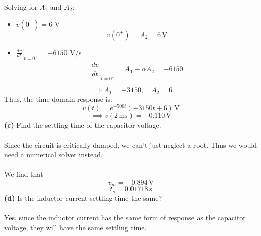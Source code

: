 \documentclass[12pt]{article}
\begin{document}
Solving for $A_1$ and $A_2$:
\begin{itemize}
    \item $v(0^+) = 6$ V
    \[v(0^+) = A_2 = 6\,\text{V}\]
    \item $\left.\frac{dv}{dt}\right|_{t=0^+} = -6150$ V/s
    \[ \left.\frac{dv}{dt}\right|_{t=0^+} = A_1 - \alpha A_2 = -6150 \]
\end{itemize}
\[\implies A_1 = -3150,\quad A_2 = 6\]
Thus, the time domain response is:
\[\boxed{v(t) = e^{-500t}(-3150t + 6)\,\text{V}}\]
\[\implies \boxed{v(2\,\text{ms}) = -0.110\,\text{V}}\]
\textbf{(c)} Find the settling time of the capacitor voltage.\\\\
Since the circuit is critically damped, we can't just neglect a root. Thus we would need a numerical solver instead.\\\\
We find that
\[v_m=-0.894\,\text{V}\]
\[\boxed{t_s = 0.01718\,\text{s}}\]
\textbf{(d)} Is the inductor current settling time the same?\\\\
Yes, since the inductor current has the same form of response as the capacitor voltage, they will have the same settling time.
\end{document}
